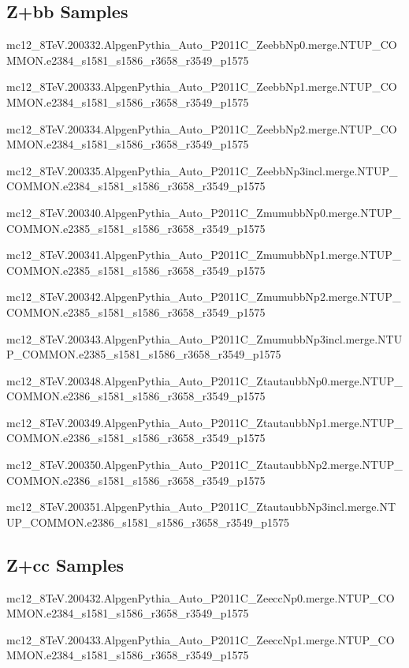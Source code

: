 \subsection{Z+bb Samples}
mc12\_8TeV.200332.AlpgenPythia\_Auto\_P2011C\_ZeebbNp0.merge.NTUP\_COMMON.e2384\_s1581\_s1586\_r3658\_r3549\_p1575

mc12\_8TeV.200333.AlpgenPythia\_Auto\_P2011C\_ZeebbNp1.merge.NTUP\_COMMON.e2384\_s1581\_s1586\_r3658\_r3549\_p1575

mc12\_8TeV.200334.AlpgenPythia\_Auto\_P2011C\_ZeebbNp2.merge.NTUP\_COMMON.e2384\_s1581\_s1586\_r3658\_r3549\_p1575

mc12\_8TeV.200335.AlpgenPythia\_Auto\_P2011C\_ZeebbNp3incl.merge.NTUP\_COMMON.e2384\_s1581\_s1586\_r3658\_r3549\_p1575

mc12\_8TeV.200340.AlpgenPythia\_Auto\_P2011C\_ZmumubbNp0.merge.NTUP\_COMMON.e2385\_s1581\_s1586\_r3658\_r3549\_p1575

mc12\_8TeV.200341.AlpgenPythia\_Auto\_P2011C\_ZmumubbNp1.merge.NTUP\_COMMON.e2385\_s1581\_s1586\_r3658\_r3549\_p1575

mc12\_8TeV.200342.AlpgenPythia\_Auto\_P2011C\_ZmumubbNp2.merge.NTUP\_COMMON.e2385\_s1581\_s1586\_r3658\_r3549\_p1575

mc12\_8TeV.200343.AlpgenPythia\_Auto\_P2011C\_ZmumubbNp3incl.merge.NTUP\_COMMON.e2385\_s1581\_s1586\_r3658\_r3549\_p1575

mc12\_8TeV.200348.AlpgenPythia\_Auto\_P2011C\_ZtautaubbNp0.merge.NTUP\_COMMON.e2386\_s1581\_s1586\_r3658\_r3549\_p1575

mc12\_8TeV.200349.AlpgenPythia\_Auto\_P2011C\_ZtautaubbNp1.merge.NTUP\_COMMON.e2386\_s1581\_s1586\_r3658\_r3549\_p1575

mc12\_8TeV.200350.AlpgenPythia\_Auto\_P2011C\_ZtautaubbNp2.merge.NTUP\_COMMON.e2386\_s1581\_s1586\_r3658\_r3549\_p1575

mc12\_8TeV.200351.AlpgenPythia\_Auto\_P2011C\_ZtautaubbNp3incl.merge.NTUP\_COMMON.e2386\_s1581\_s1586\_r3658\_r3549\_p1575


\subsection{Z+cc Samples}

mc12\_8TeV.200432.AlpgenPythia\_Auto\_P2011C\_ZeeccNp0.merge.NTUP\_COMMON.e2384\_s1581\_s1586\_r3658\_r3549\_p1575

mc12\_8TeV.200433.AlpgenPythia\_Auto\_P2011C\_ZeeccNp1.merge.NTUP\_COMMON.e2384\_s1581\_s1586\_r3658\_r3549\_p1575

